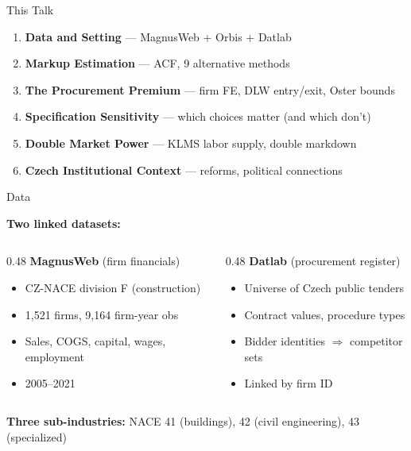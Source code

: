 \documentclass[aspectratio=169,11pt]{beamer}
\newcommand{\accenttext}[1]{\textcolor{accent}{\textbf{#1}}}
\begin{document}
\begin{frame}{This Talk}

\begin{enumerate}
    \item \textbf{Data and Setting} --- MagnusWeb + Orbis + Datlab
    \item \textbf{Markup Estimation} --- ACF, 9 alternative methods
    \item \textbf{The Procurement Premium} --- firm FE, DLW entry/exit, Oster bounds
    \item \textbf{Specification Sensitivity} --- which choices matter (and which don't)
    \item \textbf{Double Market Power} --- KLMS labor supply, double markdown
    \item \textbf{Czech Institutional Context} --- reforms, political connections
\end{enumerate}

\end{frame}

\begin{frame}{Data}

\textbf{Two linked datasets:}

\medskip

\begin{columns}[T]
\begin{column}{0.48\textwidth}
\accenttext{MagnusWeb} (firm financials)
\begin{itemize}
    \item CZ-NACE division F (construction)
    \item 1,521 firms, 9,164 firm-year obs
    \item Sales, COGS, capital, wages, employment
    \item 2005--2021
\end{itemize}
\end{column}
\begin{column}{0.48\textwidth}
\accenttext{Datlab} (procurement register)
\begin{itemize}
    \item Universe of Czech public tenders
    \item Contract values, procedure types
    \item Bidder identities $\Rightarrow$ competitor sets
    \item Linked by firm ID
\end{itemize}
\end{column}
\end{columns}

\bigskip

\textbf{Three sub-industries:} NACE 41 (buildings), 42 (civil engineering), 43 (specialized)

\end{frame}
\end{document}
